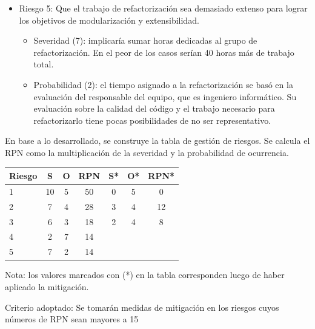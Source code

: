 \documentclass[
11pt, %
]{charter}
\begin{document}
\begin{itemize}
\begin{itemize}
\end{itemize}
\item Riesgo 5: Que el trabajo de refactorización sea demasiado extenso para lograr los objetivos de modularización y extensibilidad.
\begin{itemize}
\item Severidad (7): implicaría sumar horas dedicadas al grupo de refactorización. En el peor de los casos serían 40 horas más de trabajo total.
\item Probabilidad (2): el tiempo asignado a la refactorización se basó en la evaluación del responsable del equipo, que es ingeniero informático. Su evaluación sobre la calidad del código y el trabajo necesario para refactorizarlo tiene pocas posibilidades de no ser representativo.
\end{itemize}
\end{itemize}

En base a lo desarrollado, se construye la tabla de gestión de riesgos. Se calcula el RPN como
la multiplicación de la severidad y la probabilidad de ocurrencia.

\begin{table}[htpb]
\centering
\begin{tabularx}{\linewidth}{@{}|X|c|c|c|c|c|c|@{}}
\hline
\rowcolor[HTML]{C0C0C0} 
Riesgo & S & O & RPN & S* & O* & RPN* \\ \hline
   1   &  10 & 5  &  50   &  0  &  5  &  0    \\ \hline
   2   &  7 & 4  &   28  &  3  &  4  &   12   \\ \hline
   3   &  6 & 3  &   18  &  2  &   4 &   8   \\ \hline
   4   &  2 & 7 &   14 &    &    &      \\ \hline
   5   &  7 & 2  &  14   &    &    &      \\ \hline
\end{tabularx}%
\end{table}

Nota: los valores marcados con (*) en la tabla corresponden luego de haber aplicado la mitigación.

Criterio adoptado: 
Se tomarán medidas de mitigación en los riesgos cuyos números de RPN sean mayores a 15
\end{document}
